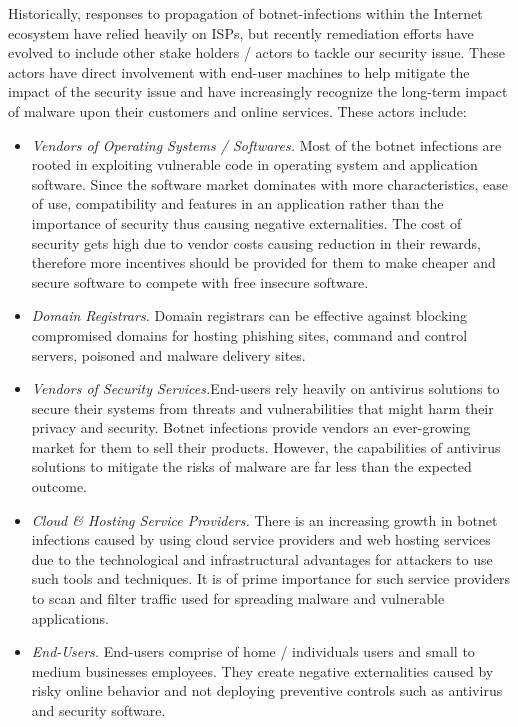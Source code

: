 Historically, responses to propagation of botnet-infections within the Internet ecosystem have relied heavily on ISPs, but recently remediation efforts have evolved to include other stake holders / actors to tackle our security issue. These actors have direct involvement with end-user machines to help mitigate the impact of the security issue and have increasingly recognize the long-term impact of malware upon their customers and online services. These actors include:

\begin{itemize}
\item \textit{Vendors of Operating Systems / Softwares.} Most of the botnet infections are rooted in exploiting vulnerable code in operating system and application software. Since the software market dominates with more characteristics, ease of use, compatibility and features in an application rather than the importance of security thus causing negative externalities. The cost of security gets high due to vendor costs causing reduction in their rewards, therefore more incentives should be provided for them to make cheaper and secure software to compete with free insecure software.
\item \textit{Domain Registrars.} Domain registrars can be effective against blocking compromised domains for hosting phishing sites, command and control servers, poisoned and malware delivery sites.
\item \textit{Vendors of Security Services.}End-users rely heavily on antivirus solutions to secure their systems from threats and vulnerabilities that might harm their privacy and security. Botnet infections provide vendors an ever-growing market for them to sell their products. However, the capabilities of antivirus solutions to mitigate the risks of malware are far less than the expected outcome.
\item \textit{Cloud \& Hosting Service Providers.} There is an increasing growth in botnet infections caused by using cloud service providers and web hosting services due to the technological and infrastructural advantages for attackers to use such tools and techniques. It is of prime importance for such service providers to scan and filter traffic used for spreading malware and vulnerable applications.
\item \textit{End-Users.} End-users comprise of home / individuals users and small to medium businesses employees. They create negative externalities caused by risky online behavior and not deploying preventive controls such as antivirus and security software.
\end{itemize}
